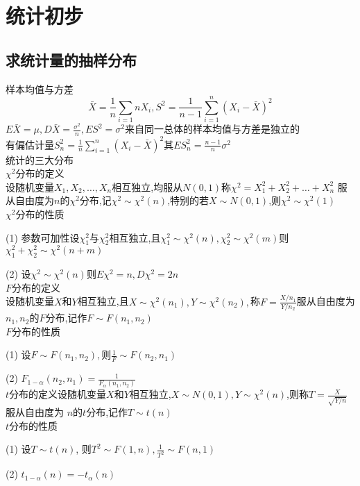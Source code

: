 \documentclass[12pt, a4paper, oneside, UTF8]{ctexbook}
\begin{document}
% 
\else
\fi

\chapter{统计初步}

\section{求统计量的抽样分布}
\begin{remark}
    样本均值与方差
    \[
    \bar{X}=\frac{1}{n}\sum_{i=1}{n}X_i, S^2=\frac{1}{n-1}\sum_{i=1}^{n}(X_i-\bar{X})^2
    \]
    $E\bar{X}=\mu,D\bar{X}=\frac{\sigma^2}{n},ES^2=\sigma^2${\color{red}来自同一总体的样本均值与方差是独立的} \\
    有偏估计量$S_{n}^{2}=\frac{1}{n}\sum_{i=1}^{n}(X_i-\bar{X})^2$其$ES_{n}^{2}=\frac{n-1}{n}\sigma^2$ \\
    统计的三大分布 \\
    $\chi^2$分布的定义\\ 
    设随机变量$X_1,X_2,\ldots,X_n$相互独立,均服从$N(0,1)$称$\chi^2=X_1^2+X_2^2+\ldots+X_n^2$
    服从自由度为$n$的$\chi^2$分布,记$\chi^2\sim\chi^2(n)$,特别的若$X\sim N(0,1)$,则$\chi^2\sim\chi^2(1)$ \\
    $\chi^2$分布的性质
    \item[(1)] 参数可加性\qquad 设$\chi_1^2$与$\chi_2^2$相互独立,且$\chi_1^2\sim\chi^2(n),\chi_2^2\sim\chi^2(m)$则
    $\chi_1^2+\chi_2^2\sim\chi^2(n+m)$
    \item[(2)] 设$\chi^2\sim\chi^2(n)$则$E\chi^2=n,D\chi^2=2n$ \\
    $F$分布的定义 \\
    设随机变量$X$和$Y$相互独立,且$X\sim \chi^2(n_1),Y\sim\chi^2(n_2),$称$F=\frac{X/n_1}{Y/n_2}$服从自由度为
    $n_1,n_2$的$F$分布,记作$F\sim F(n_1,n_2)$\\
    $F$分布的性质 
    \item[(1)] 设$F\sim F(n_1,n_2),$则$\frac{1}{F}\sim F(n_2,n_1)$
    \item[(2)] $F_{1-\alpha}(n_2,n_1)=\frac{1}{F_{\alpha}(n_1,n_2)}$ \\
    $t$分布的定义\qquad 设随机变量$X$和$Y$相互独立,$X\sim N(0,1),Y\sim \chi^2(n)$,则称$T=\frac{X}{\sqrt{Y/n}}$服从自由度为
    $n$的$t$分布,记作$T\sim t(n)$ \\
    $t$分布的性质
    \item[(1)] 设$T\sim t(n)$, 则$T^2\sim F(1, n),\frac{1}{T^2}\sim F(n,1)$ 
    \item[(2)] $t_{1-\alpha}(n)=-t_{\alpha}(n)$ 
\end{remark}
\end{document}
